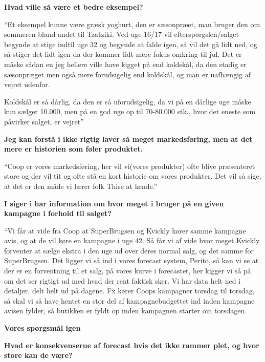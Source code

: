 \documentclass[
  12pt,
  a4paper,
  DIV=11,
  numbers=noendperiod]{scrartcl}
\begin{document}
\begin{itemize}
  \textbf{Hvad ville så være et bedre eksempel?}~

  ``Et eksempel kunne være græsk yoghurt, den er sæsonpræet, man bruger
  den om sommeren bland andet til Tzatziki. Ved uge 16/17 vil
  efterspørgslen/salget begynde at stige indtil uge 32 og begynde at
  falde igen, så vil det gå lidt ned, og så stiger det lidt igen da der
  kommer lidt mere fokus omkring til jul. Det er måske sådan en jeg
  hellere ville have kigget på end koldskål, da den stadig er
  sæsonpræget men også mere forudsigelig end koldskål, og man er
  uafhængig af vejret udenfor.~

  Koldskål er så dårlig, da den er så uforudsigelig, da vi på en dårlige
  uge måske kun sælger 10.000, men på en god uge op til 70-80.000 stk.,
  hvor det eneste som påvirker salget, er vejret''~

  \textbf{Jeg kan forstå i ikke rigtig laver så meget markedsføring, men
  at det mere er historien som føler produktet.}~

  ``Coop er vores markedsføring, her vil vi(vores produkter) ofte blive
  præsenteret store og der vil tit og ofte stå en kort historie om vores
  produkter. Det vil så sige, at det er den måde vi lærer folk Thise at
  kende.''~

  \textbf{I siger i har information om hvor meget i bruger på en given
  kampagne i forhold til salget?}~

  ``Vi får at vide fra Coop at SuperBrugsen og Kvickly kører samme
  kampagne avis, og at de vil køre en kampagne i uge 42. Så får vi af
  vide hvor meget Kvickly forventer at sælge ekstra i den uge ud over
  deres normal salg, og det samme for SuperBrugsen. Det ligger vi så ind
  i vores forecast system, Perito, så kan vi se at der er en forventning
  til et salg, på vores kurve i forecastet, her kigger vi så på om det
  ser rigtigt ud med hvad der rent faktisk sker. Vi har data helt ned i
  detaljer, delt helt ud på dagene. Fx kører Coops kampagner torsdag til
  torsdag, så skal vi så have hentet en stor del af kampagnebudgettet
  ind inden kampagne avisen fylder, så butikken er fyldt op inden
  kampagnen starter om torsdagen.~

  \textbf{Vores spørgsmål igen}~

  \textbf{Hvad er konsekvenserne af forecast hvis det ikke rammer plet,
  og hvor store kan de være?}~


\end{itemize}
\end{document}
